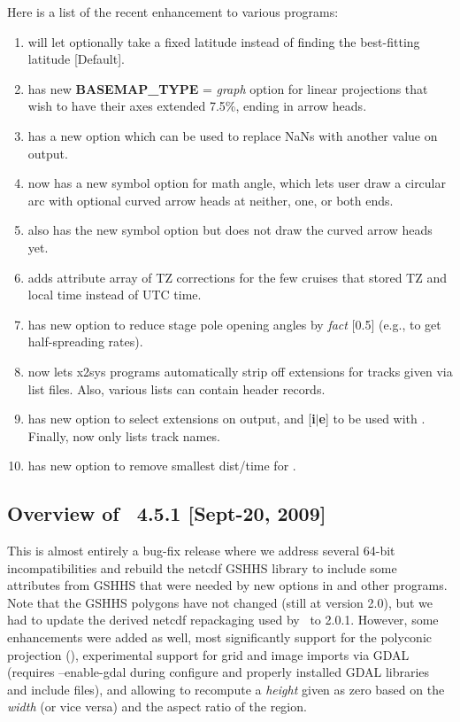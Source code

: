 Here is a list of the recent enhancement to various programs:

\begin{enumerate}
	\item {} will let  optionally take a fixed latitude instead of finding
		the best-fitting latitude [Default].
	\item {} has new {\bf BASEMAP\_TYPE} = {\it graph} option for linear projections that wish to
		have their axes extended 7.5\%, ending in arrow heads.
	\item {} has a new option  which can be used to replace NaNs with another value on output.
	\item {} now has a new symbol  option for math angle, which lets
		user draw a circular arc with optional curved arrow heads at neither, one, or both ends.
	\item {} also has the new symbol  option but does not draw the curved arrow heads yet.
	\item {} adds attribute array of TZ corrections for the few cruises
		that stored TZ and local time instead of UTC time.
	\item {} has new option  to reduce stage pole opening
		angles by {\it fact} [0.5] (e.g., to get half-spreading rates).
	\item {} now lets x2sys programs automatically strip off extensions for tracks given via list files.
		Also, various lists can contain header records.
	\item {} has new option  to select extensions on output, and [{\bf i$|$e}] to be used with .
	Finally,  now only lists track names.
	\item {} has new option  to remove smallest dist/time for .
\end{enumerate}

\subsection{Overview of \gmt\ 4.5.1 [Sept-20, 2009]}

This is almost entirely a bug-fix release where we address several 64-bit incompatibilities and
rebuild the netcdf GSHHS library to include some attributes from GSHHS that were needed
by new options in  and other programs.  Note that the GSHHS polygons have not changed (still
at version 2.0), but we had to update the derived netcdf repackaging used by \GMT\ to 2.0.1.
However, some enhancements were added as well, most significantly support for the polyconic
projection (), experimental support for grid and image imports via GDAL
(requires --enable-gdal during configure and properly installed GDAL libraries and include files),
and allowing  to recompute a {\it height} given as zero based on the
{\it width} (or vice versa) and the aspect ratio of the region.

